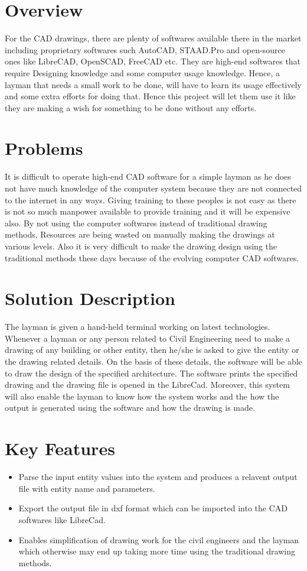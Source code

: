 \section{Overview}
For the CAD drawings, there are plenty of softwares available there in the market including proprietary softwares such AutoCAD, STAAD.Pro and open-source ones like LibreCAD, OpenSCAD, FreeCAD etc. They are high-end softwares that require Designing knowledge and some computer usage knowledge. Hence, a layman that needs a small work to be done, will have to learn its usage effectively and some extra efforts for doing that. Hence this project will let them use it like they are making a wish for something to be done without any efforts.


\section{Problems}
It is difficult to operate high-end CAD software for a simple layman as he does not have  much knowledge of the computer system because they are not connected to the internet in any ways. Giving training to these peoples is not easy as there is not so much manpower available to provide training and it will be expensive also. By not using the computer softwares instead of traditional drawing methods, Resources are being wasted 
on manually making the drawings at various levels.
Also it is very difficult to make the drawing design using the traditional methods these days because of the evolving computer CAD softwares.

\section{Solution Description}
The layman is given a hand-held terminal working on latest technologies. Whenever a layman or any person related to Civil Engineering need to make a drawing of any building or other entity, then he/she is asked to give the entity or the drawing related details. On the basis of these details, the software will be able to draw the design of the specified architecture.  The software prints the specified drawing and the drawing file is opened in the LibreCad.
Moreover, this system will also enable the layman to know how the system works and the how the output is generated using the software and how the drawing is made.

\section{Key Features}
\begin{itemize}
\item Parse the input entity values into the system and produces a relavent output file with entity name and parameters.
\item Export the output file in dxf format which can be imported into the CAD softwares like LibreCad.
\item Enables simplification of drawing work for the civil engineers and the layman which otherwise may end up taking more time using the traditional drawing methods. 
\end{itemize}
